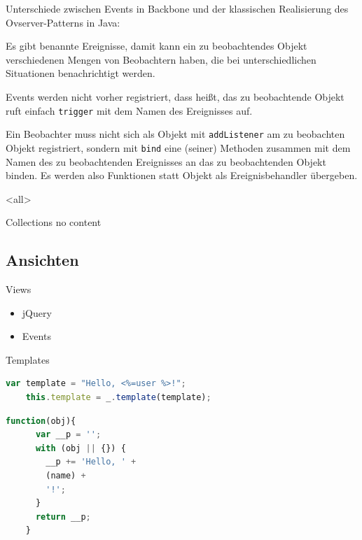 Unterschiede zwischen Events in Backbone und der klassischen Realisierung
des Ovserver-Patterns in Java:
\begin{compactitem}
  \item Es gibt benannte Ereignisse, damit kann ein zu beobachtendes Objekt
    verschiedenen Mengen von Beobachtern haben, die bei unterschiedlichen
    Situationen benachrichtigt werden.
  \item Events werden nicht vorher registriert, dass heißt, das zu beobachtende
    Objekt ruft einfach \lstinline-trigger- mit dem Namen des Ereignisses auf.
  \item Ein Beobachter muss nicht sich als Objekt mit \lstinline-addListener-
    am zu beobachten Objekt registriert, sondern mit \lstinline-bind-
    eine (seiner) Methoden zusammen mit dem Namen des zu beobachtenden
    Ereignisses an das zu beobachtenden Objekt binden. Es werden also
    Funktionen statt Objekt als Ereignisbehandler übergeben.
\end{compactitem}

\mode
<all>

\begin{frame}{Collections}
  no content
\end{frame}

\subsection{Ansichten}

\begin{frame}{Views}
  \begin{itemize}
    \item jQuery
    \item Events
  \end{itemize}
\end{frame}

\begin{frame}[fragile]{Templates}
  \begin{lstlisting}[language=JavaScript,gobble=4]
    var template = "Hello, <%=user %>!";
    this.template = _.template(template);
  \end{lstlisting}
  
  \begin{lstlisting}[language=JavaScript,gobble=4]
    function(obj){
      var __p = '';
      with (obj || {}) {
        __p += 'Hello, ' +
        (name) +
        '!';
      }
      return __p;
    }
  \end{lstlisting}
\end{frame}

